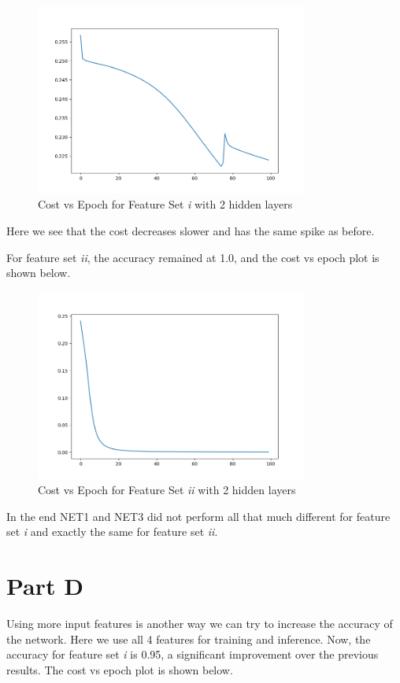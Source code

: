 \documentclass{article}
\begin{document}
\begin{figure}[H]
  \centering
  \includegraphics[width=0.8\textwidth]{Figure_6.png}
  \caption{Cost vs Epoch for Feature Set \textit{i} with 2 hidden layers}
\end{figure}

Here we see that the cost decreases slower and has the same spike as before.

For feature set \textit{ii}, the accuracy remained at 1.0, and the cost vs epoch plot is shown below.

\begin{figure}[H]
  \centering
  \includegraphics[width=0.8\textwidth]{Figure_7.png}
  \caption{Cost vs Epoch for Feature Set \textit{ii} with 2 hidden layers}
\end{figure}

In the end NET1 and NET3 did not perform all that much different for feature set \textit{i} and exactly the same for feature set \textit{ii}.

\section{Part D}
Using more input features is another way we can try to increase the accuracy of the network.
Here we use all 4 features for training and inference.
Now, the accuracy for feature set \textit{i} is 0.95, a significant improvement over the previous results.
The cost vs epoch plot is shown below.
\end{document}
